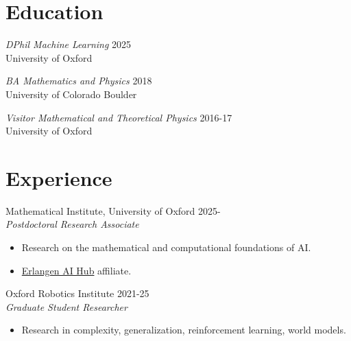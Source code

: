 \documentclass[margin]{res}
\begin{document}
\begin{resume}


    \section{Education} {\sl DPhil Machine Learning} \hfill 2025\\
                University of Oxford

  {\sl BA Mathematics and Physics} \hfill 2018\\
  University of Colorado Boulder

  {\sl Visitor Mathematical and Theoretical Physics} \hfill 2016-17\\
  University of Oxford

  \section{Experience}
  Mathematical Institute, University of Oxford \hfill 2025-\\
                 {\sl Postdoctoral Research Associate}
                 \begin{itemize}  \itemsep -2pt %
                 \item Research on the mathematical and computational foundations of AI.
                 \item \href{https://erlangenhub.ox.ac.uk/}{Erlangen AI Hub} affiliate.
                 \end{itemize}

  Oxford Robotics Institute \hfill 2021-25\\
                 {\sl Graduate Student Researcher}
                 \begin{itemize}  \itemsep -2pt %
                 \item Research in complexity, generalization, reinforcement learning, world models.
                 \end{itemize}


\end{resume}
\end{document}
